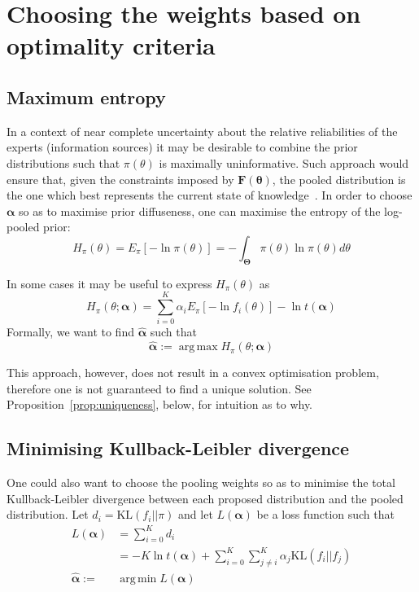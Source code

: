 \documentclass[a4paper, notitlepage, 11pt]{article}
\DeclareMathOperator*{\argmin}{arg\,min}
\DeclareMathOperator*{\argmax}{arg\,max}
\begin{document}
\section*{Choosing the weights based on optimality criteria}
\subsection*{Maximum entropy}

In a context of near complete uncertainty about the relative reliabilities of the experts (information sources) it may be desirable to combine the prior distributions such that $\pi(\theta)$ is maximally uninformative.
Such approach would ensure that, given the constraints imposed by $\mathbf{F(\theta)}$, the pooled distribution is the one which best represents the current state of knowledge~\citep{jaynes1957,savchuk1994}.
In order to choose $\boldsymbol\alpha$ so as to maximise prior 
diffuseness, one can maximise the entropy of the log-pooled prior:
\begin{equation}
\label{eq:entropypiA}
H_{\pi}(\theta) = E_{\pi}\left[-\ln\pi(\theta) \right] =-\int_{\boldsymbol\Theta}\pi(\theta)\ln\pi(\theta)d\theta 
\end{equation}

In some cases it may be useful to express $H_{\pi}(\theta)$ as
\begin{equation}
\label{eq:entropypiB}
 H_{\pi}(\theta; \boldsymbol\alpha) = \sum_{i=0}^{K} \alpha_i E_{\pi}[ - \ln f_i(\theta)] - \ln t(\boldsymbol\alpha)
\end{equation}
Formally, we want to find $\hat{\boldsymbol\alpha}$ such that
\begin{equation}
\label{eq:argmaxEnt}
 \hat{\boldsymbol\alpha}:= \argmax H_{\pi}(\theta; \boldsymbol\alpha)  
\end{equation}

This approach, however, does not result in a convex optimisation problem, therefore one is not guaranteed to find a unique solution. 
See Proposition~\ref{prop:uniqueness}, below, for intuition as to why.

\subsection*{Minimising Kullback-Leibler divergence}

One could also want to choose the pooling weights so as to minimise the total Kullback-Leibler divergence between each proposed distribution and the pooled distribution.
Let $d_i = \text{KL}(f_i || \pi)$ and let $L(\boldsymbol\alpha)$ be a loss function such that
\begin{align}
L(\boldsymbol\alpha) &= \sum_{i=0}^Kd_i \\
\label{eq:KLexpanded}
     &= -K\ln t(\boldsymbol\alpha) + \sum_{i=0}^K\sum_{j\neq i}^K\alpha_j\text{KL}(f_i||f_j) \\
     \label{eq:argminKL}
     \hat{\boldsymbol\alpha}:=& \argmin L(\boldsymbol\alpha)   
\end{align}
\end{document}
